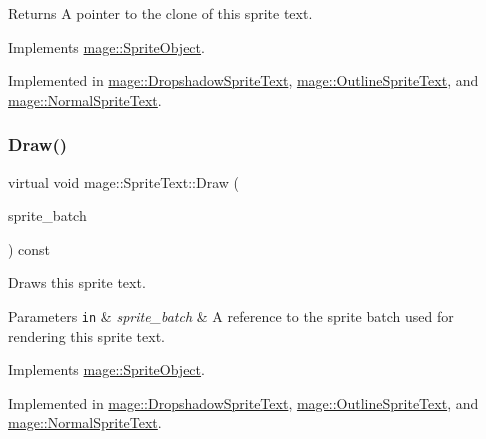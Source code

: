 \begin{DoxyReturn}{Returns}
A pointer to the clone of this sprite text. 
\end{DoxyReturn}


Implements \hyperlink{classmage_1_1_sprite_object_a7ae445af224769ee5e69c9468670a03f}{mage\+::\+Sprite\+Object}.



Implemented in \hyperlink{classmage_1_1_dropshadow_sprite_text_a300716c6bd3a6087d3c637253cb61cc1}{mage\+::\+Dropshadow\+Sprite\+Text}, \hyperlink{classmage_1_1_outline_sprite_text_a90ed9cba10e082d6ce07dfa1b6189246}{mage\+::\+Outline\+Sprite\+Text}, and \hyperlink{classmage_1_1_normal_sprite_text_ae3e8cf71bdf82a4a9df15c00d5be8799}{mage\+::\+Normal\+Sprite\+Text}.

\hypertarget{classmage_1_1_sprite_text_a45d5ac8410d5a46b26e8491946a2ad9e}{}\label{classmage_1_1_sprite_text_a45d5ac8410d5a46b26e8491946a2ad9e} 
\subsubsection{\texorpdfstring{Draw()}{Draw()}}
{\footnotesize\ttfamily virtual void mage\+::\+Sprite\+Text\+::\+Draw (\begin{DoxyParamCaption}\item[{Sprite\+Batch \&}]{sprite\+\_\+batch }\end{DoxyParamCaption}) const\hspace{0.3cm}{\ttfamily [pure virtual]}}

Draws this sprite text.


\begin{DoxyParams}[1]{Parameters}
\mbox{\tt in}  & {\em sprite\+\_\+batch} & A reference to the sprite batch used for rendering this sprite text. \\
\hline
\end{DoxyParams}


Implements \hyperlink{classmage_1_1_sprite_object_a1c1c885fe7846f7ee1cc0b73571c2fa0}{mage\+::\+Sprite\+Object}.



Implemented in \hyperlink{classmage_1_1_dropshadow_sprite_text_af76422c9812d7dc38e9b98e587103c67}{mage\+::\+Dropshadow\+Sprite\+Text}, \hyperlink{classmage_1_1_outline_sprite_text_a524e9ad1caeeeaa32405e61d1a5e1032}{mage\+::\+Outline\+Sprite\+Text}, and \hyperlink{classmage_1_1_normal_sprite_text_ad2a1b02bea18afd6bf61b106a727a355}{mage\+::\+Normal\+Sprite\+Text}.

